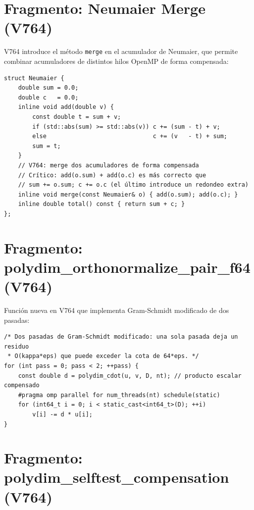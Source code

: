 \section{Fragmento: Neumaier Merge (V764)}
\label{sec:neumaier_merge}

V764 introduce el método \texttt{merge} en el acumulador de Neumaier, que permite combinar
acumuladores de distintos hilos OpenMP de forma compensada:

\begin{lstlisting}[style=cppstyle, caption={Neumaier::merge --- V764 (línea 98)}, label=lst:neumaier_merge]
struct Neumaier {
    double sum = 0.0;
    double c   = 0.0;
    inline void add(double v) {
        const double t = sum + v;
        if (std::abs(sum) >= std::abs(v)) c += (sum - t) + v;
        else                              c += (v   - t) + sum;
        sum = t;
    }
    // V764: merge dos acumuladores de forma compensada
    // Crítico: add(o.sum) + add(o.c) es más correcto que 
    // sum += o.sum; c += o.c (el último introduce un redondeo extra)
    inline void merge(const Neumaier& o) { add(o.sum); add(o.c); }
    inline double total() const { return sum + c; }
};
\end{lstlisting}

\section{Fragmento: polydim\_orthonormalize\_pair\_f64 (V764)}
\label{sec:ortho_pair}

Función nueva en V764 que implementa Gram-Schmidt modificado de dos pasadas:

\begin{lstlisting}[style=cppstyle, caption={Gram-Schmidt 2 pasadas --- V764 (línea 365)}, label=lst:gram2pass]
/* Dos pasadas de Gram-Schmidt modificado: una sola pasada deja un residuo
 * O(kappa*eps) que puede exceder la cota de 64*eps. */
for (int pass = 0; pass < 2; ++pass) {
    const double d = polydim_cdot(u, v, D, nt); // producto escalar compensado
    #pragma omp parallel for num_threads(nt) schedule(static)
    for (int64_t i = 0; i < static_cast<int64_t>(D); ++i)
        v[i] -= d * u[i];
}
\end{lstlisting}

\section{Fragmento: polydim\_selftest\_compensation (V764)}
\label{sec:selftest}

